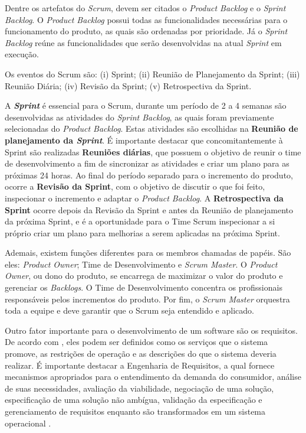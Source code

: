 Dentre os artefatos do \textit{Scrum}, devem ser citados o \textit{Product Backlog} e o \textit{Sprint Backlog}. O \textit{Product Backlog} possui todas as funcionalidades necessárias para o funcionamento do produto, as quais são ordenadas por prioridade. Já o \textit{Sprint Backlog} reúne as funcionalidades que serão desenvolvidas na atual \textit{Sprint} em execução.

Os eventos do Scrum são: (i) Sprint; (ii) Reunião de Planejamento da Sprint; (iii) Reunião Diária; (iv) Revisão da Sprint; (v) Retrospectiva da Sprint.

A \textbf{\textit{Sprint}} é essencial para o Scrum, durante um período de 2 a 4 semanas são desenvolvidas as atividades do \textit{Sprint Backlog}, as quais foram previamente selecionadas do \textit{Product Backlog}. Estas atividades são escolhidas na \textbf{Reunião de planejamento da \textit{Sprint}}. É importante destacar que concomitantemente à Sprint são realizadas \textbf{Reuniões diárias}, que possuem o objetivo de reunir o time de desenvolvimento a fim de sincronizar as atividades e criar um plano para as próximas 24 horas. Ao final do período separado para o incremento do produto, ocorre a \textbf{Revisão da Sprint}, com o objetivo de discutir o que foi feito, inspecionar o incremento e adaptar o \textit{Product Backlog}. A \textbf{Retrospectiva da Sprint} ocorre depois da Revisão da Sprint e antes da Reunião de planejamento da próxima Sprint, e é a oportunidade para o Time Scrum inspecionar a si próprio criar um plano para melhorias a serem aplicadas na próxima Sprint.

Ademais, existem funções diferentes para os membros chamadas de papéis. São eles: \textit{Product Owner}; Time de Desenvolvimento e \textit{Scrum Master}. 
O \textit{Product Owner}, ou dono do produto, se encarrega de maximizar o valor do produto e gerenciar os \textit{Backlogs}. O Time de Desenvolvimento concentra os profissionais responsáveis pelos incrementos do produto. Por fim, o \textit{Scrum Master} orquestra toda a equipe e deve garantir que o Scrum seja entendido e aplicado.

Outro fator importante para o desenvolvimento de um software são os requisitos. De acordo com \cite{Sommervile2010}, eles podem ser definidos como os serviços que o sistema promove, as restrições de operação e as descrições do que o sistema deveria realizar. É importante destacar a Engenharia de Requisitos, a qual fornece mecanismos apropriados para o entendimento da demanda do consumidor, análise de suas necessidades, avaliação da viabilidade, negociação de uma solução, especificação de uma solução não ambígua, validação da especificação e gerenciamento de requisitos enquanto são transformados em um sistema operacional \citep{Pressman2014}. 

